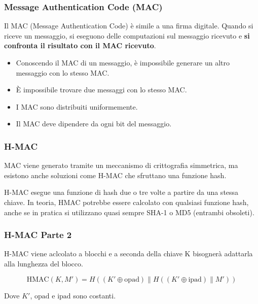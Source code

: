 \begin{frame}
\frametitle{Message Authentication Code (MAC)}

Il MAC (Message Authentication Code) è simile a una firma digitale. 
Quando si riceve un messaggio, si eseguono delle computazioni sul messaggio ricevuto e \textbf{si confronta il risultato con il MAC ricevuto}.

\begin{itemize}
    \item Conoscendo il MAC di un messaggio, è impossibile generare un altro messaggio con lo stesso MAC.
    \item È impossibile trovare due messaggi con lo stesso MAC.
    \item I MAC sono distribuiti uniformemente.
    \item Il MAC deve dipendere da ogni bit del messaggio.
\end{itemize}
\end{frame}

\begin{frame}
\frametitle{H-MAC}

MAC viene generato tramite un meccanismo di crittografia simmetrica, ma esistono anche soluzioni come H-MAC 
che sfruttano una funzione hash.

\vspace{1cm}

H-MAC esegue una funzione di hash due o tre volte a partire da una stessa chiave. In teoria, HMAC potrebbe essere 
calcolato con qualsiasi funzione hash, anche se in pratica si utilizzano quasi sempre SHA-1 o MD5 (entrambi obsoleti).


\end{frame}

\begin{frame}
    \frametitle{H-MAC Parte 2}

H-MAC viene aclcolato a blocchi e a seconda della chiave K bisognerà adattarla alla lunghezza del blocco.

\[
\text{HMAC}(K, M') = H((K' \oplus \text{opad}) \| H((K' \oplus \text{ipad}) \| M'))
\]

Dove $K'$, $\text{opad}$ e $\text{ipad}$ sono costanti.

\end{frame}

